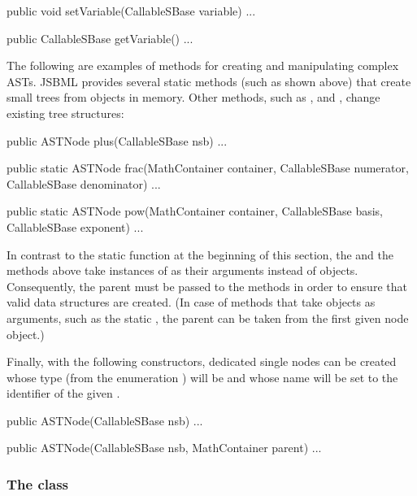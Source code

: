 \begin{example}[title={Getter and setter for \CallableSBase.}]
public void setVariable(CallableSBase variable) { ... }

public CallableSBase getVariable() { ... }
\end{example}

The following are examples of methods for creating and manipulating complex
ASTs.  JSBML provides several static methods (such as  shown above)
that create small trees from objects in memory.  Other methods, such as
,  and , change existing tree structures:

\begin{example}[title={Some examples for convenience methods, some of
    them static methods, provided by JSBML for working with \ASTNode{}s.}]
public ASTNode plus(CallableSBase nsb) { ... }

public static ASTNode frac(MathContainer container,
      CallableSBase numerator, CallableSBase denominator) { ... }

public static ASTNode pow(MathContainer container,
      CallableSBase basis, CallableSBase exponent) { ... }
\end{example}

In contrast to the static  function at the beginning of
this section, the  and the  methods above take instances
of \CallableSBase as their arguments instead of \ASTNode objects. Consequently, the
parent \MathContainer must be passed to the methods in order to ensure that
valid data structures are created. (In case of methods that take \ASTNode
objects as arguments, such as the static , the parent
\MathContainer can be taken from the first given node object.)

Finally, with the following \ASTNode constructors, dedicated single nodes can
be created whose type (from the enumeration \ASTType) will be  and
whose name will be set to the identifier of the given \CallableSBase.

\begin{example}
public ASTNode(CallableSBase nsb) { ... }

public ASTNode(CallableSBase nsb, MathContainer parent) { ... }
\end{example}


\subsubsection{The  class}


